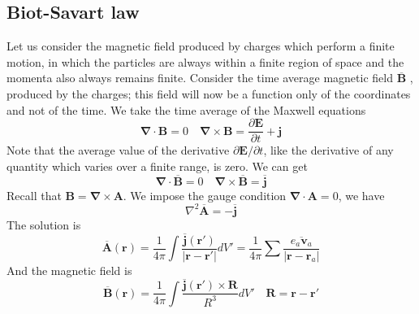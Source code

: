 \subsection{Biot-Savart law}
Let us consider the magnetic field produced by charges which perform a finite motion, in which the particles are always within a finite region of space and the momenta also always remains finite. Consider the time average magnetic field $\overline{\bm{B}}$ , produced by the charges; this field will now be a function only of the coordinates and not of the time. We take the time average of the Maxwell equations
\[\bm{\nabla} \cdot \bm{B} = 0 \quad \bm{\nabla} \times \bm{B} = \frac{\partial \bm{E}}{\partial t} + \bm{j}\] 
Note that the average value of the derivative $\partial \bm{E} / \partial t$, like the derivative of any quantity which varies over a finite range, is zero. We can get
\[\bm{\nabla} \cdot \overline{\bm{B}} = 0 \quad \bm{\nabla} \times \overline{\bm{B}} =  \overline{\bm{j}}\]
Recall that $\bm{B} = \bm{\nabla} \times \bm{A}$. We impose the gauge condition $\bm{\nabla} \cdot \bm{A} = 0$, we have
\[\nabla^2 \overline{\bm{A}} = - \overline{\bm{j}}\]
The solution is
\[\overline{\bm{A}}(\bm{r}) = \frac{1}{4\pi} \int \frac{\overline{\bm{j}}(\bm{r}')}{|\bm{r}-\bm{r}'|} dV' = \frac{1}{4\pi} \sum \overline{\frac{e_a \bm{v}_a}{|\bm{r}-\bm{r}_a|}}\]
And the magnetic field is
\[\overline{\bm{B}}(\bm{r}) = \frac{1}{4\pi} \int \frac{\overline{\bm{j}}(\bm{r}') \times \bm{R}}{R^3} dV' \quad \bm{R} = \bm{r}-\bm{r}'\]

